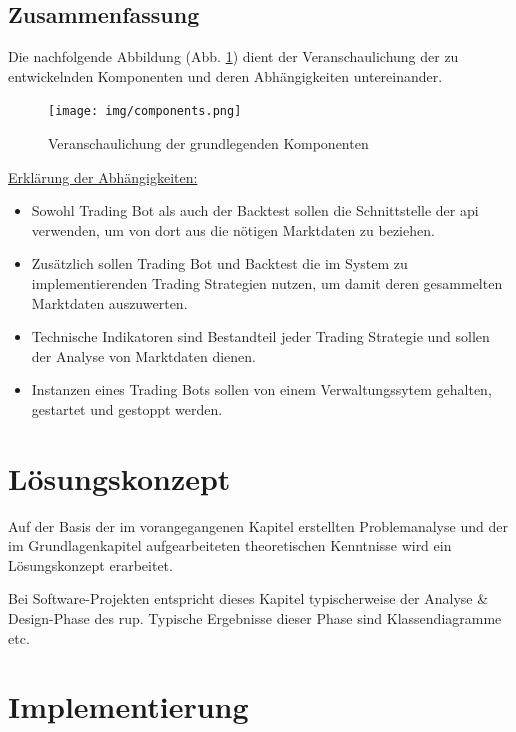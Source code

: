 \documentclass[oneside]{ausarbeitung}
\begin{document}

\section{Zusammenfassung}
\label{sec:zsmf_komponenten}

Die nachfolgende Abbildung (Abb. \ref{fig:7}) dient der
Veranschaulichung der zu entwickelnden Komponenten und deren
Abhängigkeiten untereinander.

\begin{figure}[H]
  \centering
  \texttt{[image: img/components.png]}
  \caption{Veranschaulichung der grundlegenden Komponenten}
  \label{fig:7}
\end{figure}

\underline{Erklärung der Abhängigkeiten:}
\begin{itemize}
	\item Sowohl Trading Bot als auch der Backtest sollen die Schnittstelle der
		\ac{api} verwenden, um von dort aus die nötigen Marktdaten zu beziehen.
	\item Zusätzlich sollen Trading Bot und Backtest die im System
		zu implementierenden Trading Strategien nutzen, um damit deren gesammelten 
		Marktdaten auszuwerten.
	\item Technische Indikatoren sind Bestandteil jeder Trading Strategie und
		sollen der Analyse von Marktdaten dienen.
	\item Instanzen eines Trading Bots sollen von einem Verwaltungssytem gehalten,
		gestartet und gestoppt werden.
\end{itemize}

\chapter{Lösungskonzept}
\label{cha:loesungskonzept}

Auf der Basis der im vorangegangenen Kapitel erstellten Problemanalyse 
und der im Grundlagenkapitel aufgearbeiteten theoretischen Kenntnisse 
wird ein Lösungskonzept erarbeitet.

Bei Software-Projekten entspricht dieses Kapitel typischerweise der 
Analyse \& Design-Phase des \ac{rup}. Typische Ergebnisse dieser Phase sind 
Klassendiagramme etc.

\chapter{Implementierung}
\label{cha:implementierung}
\end{document}
